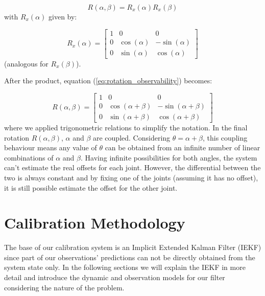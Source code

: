 \begin{equation}
R\left(\alpha,\beta\right)=R_{x}\left(\alpha\right)R_{x}\left(\beta\right)
\label{eq:rotation_observability}
\end{equation}
with $R_{x}\left(\alpha\right)$ given by:

\begin{equation}
R_{x}\left(\alpha\right)=\left[\begin{array}{ccc}
1 & 0 & 0\\
0 & \cos\left(\alpha\right) & -\sin\left(\alpha\right)\\
0 & \sin\left(\alpha\right) & \cos\left(\alpha\right)
\end{array}\right]
\end{equation}
(analogous for $R_{x}\left(\beta\right)$).

After the product, equation (\ref{eq:rotation_observability}) becomes:

\begin{equation}
R\left(\alpha,\beta\right)=\left[\begin{array}{ccc}
1 & 0 & 0\\
0 & \cos\left(\alpha+\beta\right) & -\sin\left(\alpha+\beta\right)\\
0 & \sin\left(\alpha+\beta\right) & \cos\left(\alpha+\beta\right)
\end{array}\right]
\end{equation}
where we applied trigonometric relations to simplify the notation. In the final rotation $R\left(\alpha,\beta\right)$, $\alpha$ and $\beta$ are coupled. Considering $\theta=\alpha+\beta$, this coupling behaviour means any value of $\theta$ can be obtained from an infinite number of linear combinations of $\alpha$ and $\beta$. Having infinite possibilities for both angles, the system can't estimate the real offsets for each joint. However, the differential between the two is always constant and by fixing one of the joints (assuming it has no offset), it is still possible estimate the offset for the other joint.

\section{Calibration Methodology}\label{sec:calibration_methodology}

The base of our calibration system is an Implicit Extended Kalman Filter (IEKF) since part of our observations' predictions can not be directly obtained from the system state only. In the following sections we will explain the IEKF in more detail and introduce the dynamic and observation models for our filter considering the nature of the problem.

